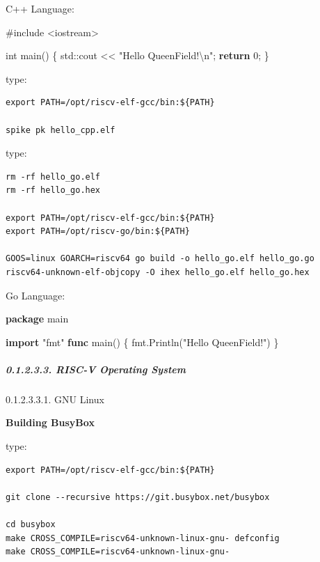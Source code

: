 \documentclass[
]{article}
\newenvironment{Shaded}{}{}
\newcommand{\BuiltInTok}[1]{#1}
\newcommand{\ControlFlowTok}[1]{\textcolor[rgb]{0.00,0.44,0.13}{\textbf{#1}}}
\newcommand{\DataTypeTok}[1]{\textcolor[rgb]{0.56,0.13,0.00}{#1}}
\newcommand{\DecValTok}[1]{\textcolor[rgb]{0.25,0.63,0.44}{#1}}
\newcommand{\ImportTok}[1]{#1}
\newcommand{\KeywordTok}[1]{\textcolor[rgb]{0.00,0.44,0.13}{\textbf{#1}}}
\newcommand{\NormalTok}[1]{#1}
\newcommand{\PreprocessorTok}[1]{\textcolor[rgb]{0.74,0.48,0.00}{#1}}
\newcommand{\SpecialCharTok}[1]{\textcolor[rgb]{0.25,0.44,0.63}{#1}}
\newcommand{\StringTok}[1]{\textcolor[rgb]{0.25,0.44,0.63}{#1}}
\begin{document}
C++ Language:

\begin{Shaded}
\begin{Highlighting}[]
\PreprocessorTok{\#include }\ImportTok{\textless{}iostream\textgreater{}}

\DataTypeTok{int}\NormalTok{ main() \{}
  \BuiltInTok{std::}\NormalTok{cout \textless{}\textless{} }\StringTok{"Hello QueenField!}\SpecialCharTok{\textbackslash{}n}\StringTok{"}\NormalTok{;}
  \ControlFlowTok{return} \DecValTok{0}\NormalTok{;}
\NormalTok{\}}
\end{Highlighting}
\end{Shaded}

type:

\begin{verbatim}
export PATH=/opt/riscv-elf-gcc/bin:${PATH}

spike pk hello_cpp.elf
\end{verbatim}

type:

\begin{verbatim}
rm -rf hello_go.elf
rm -rf hello_go.hex

export PATH=/opt/riscv-elf-gcc/bin:${PATH}
export PATH=/opt/riscv-go/bin:${PATH}

GOOS=linux GOARCH=riscv64 go build -o hello_go.elf hello_go.go
riscv64-unknown-elf-objcopy -O ihex hello_go.elf hello_go.hex
\end{verbatim}

Go Language:

\begin{Shaded}
\begin{Highlighting}[]
\KeywordTok{package}\NormalTok{ main}

\KeywordTok{import} \StringTok{"fmt"}
\KeywordTok{func}\NormalTok{ main() \{}
\NormalTok{  fmt.Println(}\StringTok{"Hello QueenField!"}\NormalTok{)}
\NormalTok{\}}
\end{Highlighting}
\end{Shaded}

\hypertarget{risc-v-operating-system-1}{%
\subparagraph{0.1.2.3.3. RISC-V Operating
System}\label{risc-v-operating-system-1}}

0.1.2.3.3.1. GNU Linux

\textbf{Building BusyBox}

type:

\begin{verbatim}
export PATH=/opt/riscv-elf-gcc/bin:${PATH}

git clone --recursive https://git.busybox.net/busybox

cd busybox
make CROSS_COMPILE=riscv64-unknown-linux-gnu- defconfig
make CROSS_COMPILE=riscv64-unknown-linux-gnu-
\end{verbatim}
\end{document}
